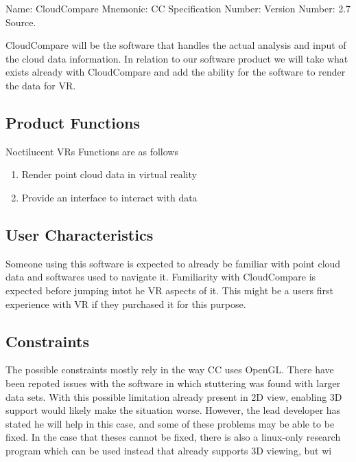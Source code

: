 \documentclass{article}
\begin{document}
Name: CloudCompare
Mnemonic: CC
Specification Number:
Version Number: 2.7
Source.

CloudCompare will be the software that handles the actual analysis and input of the cloud data information. 
In relation to our software product we will take what exists already with CloudCompare and add the ability for the software to render the data for VR.

\subsection{Product Functions}

Noctilucent VRs Functions are as follows

\begin{enumerate}
\item Render point cloud data in virtual reality
\item Provide an interface to interact with data
\end{enumerate}

\subsection{User Characteristics}

Someone using this software is expected to already be familiar with point cloud data and softwares used to navigate it. 
Familiarity with CloudCompare is expected before jumping intot he VR aspects of it.
This might be a users first experience with VR if they purchased it for this purpose.

\subsection{Constraints}

The possible constraints mostly rely in the way CC uses OpenGL. There have been repoted issues with the software in which
stuttering was found with larger data sets. With this possible limitation already present in 2D view, enabling 3D support would
likely make the situation worse. However, the lead developer has stated he will help in this case, and some of these problems 
may be able to be fixed. In the case that theses cannot be fixed, there is also a linux-only research program which can be used
instead that already supports 3D viewing, but wi
\end{document}
